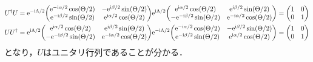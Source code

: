 \documentclass{report}
\begin{document}
  \begin{align}
    U^{\dag}U &= \e^{-\i\Lambda/2}\mqty(
      \e^{-\i\alpha / 2}\cos(\Theta / 2) & -\e^{\i\beta / 2}\sin(\Theta / 2) \\ 
      \e^{-\i\beta / 2}\sin(\Theta / 2) & \e^{\i\alpha / 2}\cos(\Theta / 2)
    )
    \e^{\i\Lambda/2}\mqty(
      \e^{\i\alpha / 2}\cos(\Theta / 2) & \e^{\i\beta / 2}\sin(\Theta / 2) \\ 
      -\e^{-\i\beta / 2}\sin(\Theta / 2) & \e^{-\i\alpha / 2}\cos(\Theta / 2)
    )
    = \mqty(1 & 0 \\ 0 & 1) \\ 
    UU^{\dag} &= \e^{\i\Lambda/2}\mqty(
      \e^{\i\alpha / 2}\cos(\Theta / 2) & \e^{\i\beta / 2}\sin(\Theta / 2) \\ 
      -\e^{-\i\beta / 2}\sin(\Theta / 2) & \e^{-\i\alpha / 2}\cos(\Theta / 2)
    )
    \e^{-\i\Lambda/2}\mqty(
      \e^{-\i\alpha / 2}\cos(\Theta / 2) & -\e^{\i\beta / 2}\sin(\Theta / 2) \\ 
      \e^{-\i\beta / 2}\sin(\Theta / 2) & \e^{\i\alpha / 2}\cos(\Theta / 2)
    )
    = \mqty(1 & 0 \\ 0 & 1)
  \end{align}
  となり，$U$はユニタリ行列であることが分かる．
\end{document}
